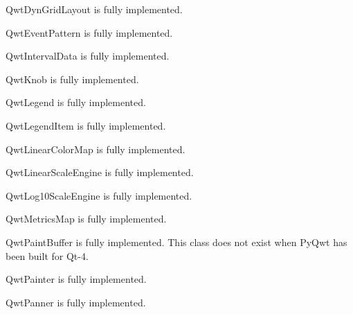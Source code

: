 \documentclass{manual}
\begin{document}
\begin{classdesc*}{QwtDynGridLayout}
  is fully implemented.
\end{classdesc*}

\begin{classdesc*}{QwtEventPattern}
  is fully implemented.
\end{classdesc*}

\begin{classdesc*}{QwtIntervalData}
  is fully implemented.
\end{classdesc*}

\begin{classdesc*}{QwtKnob}
  is fully implemented.
\end{classdesc*}

\begin{classdesc*}{QwtLegend}
  is fully implemented.
\end{classdesc*}

\begin{classdesc*}{QwtLegendItem}
  is fully implemented.
\end{classdesc*}

\begin{classdesc*}{QwtLinearColorMap}
  is fully implemented.
\end{classdesc*}

\begin{classdesc*}{QwtLinearScaleEngine}
is fully implemented.
\end{classdesc*}

\begin{classdesc*}{QwtLog10ScaleEngine}
is fully implemented.
\end{classdesc*}

\begin{classdesc*}{QwtMetricsMap}
is fully implemented.
\end{classdesc*}

\begin{classdesc*}{QwtPaintBuffer}
  is fully implemented.
  This class does not exist when PyQwt has been built for Qt-4.
\end{classdesc*}

\begin{classdesc*}{QwtPainter}
  is fully implemented.
\end{classdesc*}

\begin{classdesc*}{QwtPanner}
  is fully implemented.
\end{classdesc*}
\end{document}
